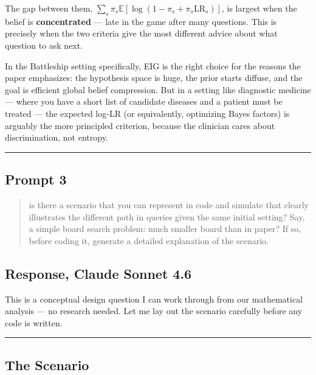 \documentclass[
]{article}
\begin{document}
The gap between them,
\(\sum_s \pi_s \mathbb{E}[\log(1 - \pi_s + \pi_s \mathrm{LR}_s)]\), is
largest when the belief is \textbf{concentrated} --- late in the game
after many questions. This is precisely when the two criteria give the
most different advice about what question to ask next.

In the Battleship setting specifically, EIG is the right choice for the
reasons the paper emphasizes: the hypothesis space is huge, the prior
starts diffuse, and the goal is efficient global belief compression. But
in a setting like diagnostic medicine --- where you have a short list of
candidate diseases and a patient must be treated --- the expected log-LR
(or equivalently, optimizing Bayes factors) is arguably the more
principled criterion, because the clinician cares about discrimination,
not entropy.

\begin{center}\rule{0.5\linewidth}{0.5pt}\end{center}

\subsection{Prompt 3}\label{prompt-3}

\begin{quote}
is there a scenario that you can represent in code and simulate that
clearly illustrates the different path in queries given the same initial
setting? Say, a simple board search problem: much smaller board than in
paper? If so, before coding it, generate a detailed explanation of the
scenario.
\end{quote}

\subsection{Response, Claude Sonnet
4.6}\label{response-claude-sonnet-4.6-2}

This is a conceptual design question I can work through from our
mathematical analysis --- no research needed. Let me lay out the
scenario carefully before any code is written.

\begin{center}\rule{0.5\linewidth}{0.5pt}\end{center}

\subsection{The Scenario}\label{the-scenario}
\end{document}

